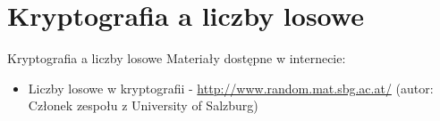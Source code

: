 \section{Kryptografia a liczby losowe}
\begin{frame}{Kryptografia a liczby losowe}
	Materiały dostępne w internecie:
	\begin{itemize}
		\item Liczby losowe w kryptografii - \href{http://www.random.mat.sbg.ac.at/}{http://www.random.mat.sbg.ac.at/} (autor: Członek zespołu z University of Salzburg)
	\end{itemize}
\end{frame}